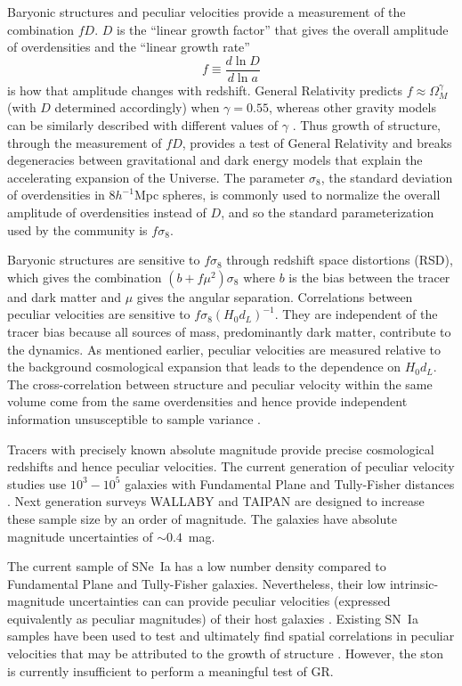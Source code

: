 \documentclass{aastex62}   	%
\begin{document}
Baryonic structures and peculiar velocities  provide a measurement of the combination $fD$.  $D$ is the ``linear growth factor'' that
gives the overall amplitude of  overdensities and the ``linear growth rate''
$$f \equiv \frac{d\ln{D}}{d\ln{a}}$$ is how that amplitude changes with redshift.  General Relativity predicts
$f \approx \Omega_M^\gamma$ (with $D$ determined accordingly) when $\gamma=0.55$, whereas other gravity models can be similarly described
with different values of $\gamma$
\citep{2007APh....28..481L}.  Thus growth of structure, through the measurement of $fD$, provides a test of General Relativity and breaks degeneracies
between gravitational and dark energy models that explain the accelerating expansion of the Universe.
The parameter $\sigma_8$, the  standard deviation of overdensities in 8$h^{-1}$Mpc spheres, is 
commonly used to normalize the
overall amplitude of  overdensities instead of $D$, and so the standard parameterization used by the community is $f\sigma_8$.

Baryonic structures are sensitive to $f\sigma_8$ through redshift space distortions (RSD), 
which gives the combination $(b + f \mu^2)\sigma_8$ where $b$ is the bias between the tracer and dark matter
and $\mu$ gives the angular separation.  Correlations between peculiar velocities are sensitive to  $f\sigma_8 (H_0 d_L)^{-1}$.
They are independent of the tracer bias because all sources of mass, predominantly dark matter, contribute to the dynamics. As
mentioned earlier, peculiar velocities are measured relative to the background cosmological expansion that
leads to the dependence on $H_0 d_L$.  The cross-correlation between structure and peculiar velocity within the same volume come from the same
overdensities and hence
provide independent information unsusceptible to sample variance \citep{2007PhRvL..99h1301G}.


Tracers with precisely known absolute magnitude provide precise cosmological redshifts and hence peculiar velocities.  
The current generation of peculiar velocity studies use $10^3-10^5$ galaxies with Fundamental Plane and Tully-Fisher distances \citep{2008AJ....135.1738M, 2014MNRAS.445.2677S,
2016AJ....152...50T}. 
Next generation surveys WALLABY \citep{2008ExA....22..151J} and TAIPAN \citep{2017PASA...34...47D} are designed to increase these sample size by an order of magnitude.
The galaxies have absolute magnitude uncertainties of $\sim 0.4$~mag. 

The current sample of SNe~Ia has a low number density compared to Fundamental Plane and Tully-Fisher galaxies.
Nevertheless, their low intrinsic-magnitude uncertainties can 
can provide peculiar velocities (expressed equivalently as peculiar magnitudes)
of their host galaxies \citep{2006PhRvD..73l3526H,2011ApJ...741...67D}.  Existing SN~Ia samples
have been used to test and ultimately find spatial correlations in peculiar velocities that may be attributed to the growth of structure
\citet{2008MNRAS.389L..47A,2015JCAP...12..033H, 2017JCAP...05..015H}.
However, the ston is currently insufficient to perform a meaningful test of GR.
\end{document}
